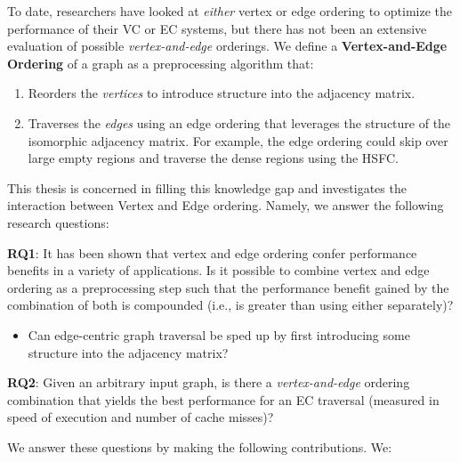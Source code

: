 To date, researchers have looked at \textit{either} vertex or edge ordering to optimize the performance of their \ac{VC} or \ac{EC} systems, but there has not been an extensive evaluation of possible \textit{vertex-and-edge} orderings. We define a \textbf{Vertex-and-Edge Ordering} of a graph as a preprocessing algorithm that:
\begin{enumerate}
    \item Reorders the \textit{vertices} to introduce structure into the adjacency matrix.
    \item Traverses the \textit{edges} using an edge ordering that leverages the structure of the isomorphic adjacency matrix. For example, the edge ordering could skip over large empty regions and traverse the dense regions using the \ac{HSFC}.
\end{enumerate}
This thesis is concerned in filling this knowledge gap and investigates the interaction between Vertex and Edge ordering. Namely, we answer the following research questions:

\textbf{RQ1}: It has been shown that vertex and edge ordering confer performance benefits in a variety of applications. Is it possible to combine vertex
and edge ordering as a preprocessing step such that the performance benefit gained by the combination of both is compounded (i.e., is greater than using either separately)?
\begin{itemize}
  \item Can edge-centric graph traversal be sped up by first introducing some structure into the adjacency matrix?
\end{itemize}

\textbf{RQ2}: Given an arbitrary input graph, is there a \textit{vertex-and-edge} ordering combination that yields the best performance for an \ac{EC} traversal (measured in speed of execution and number of cache misses)?

We answer these questions by making the following contributions. We:


